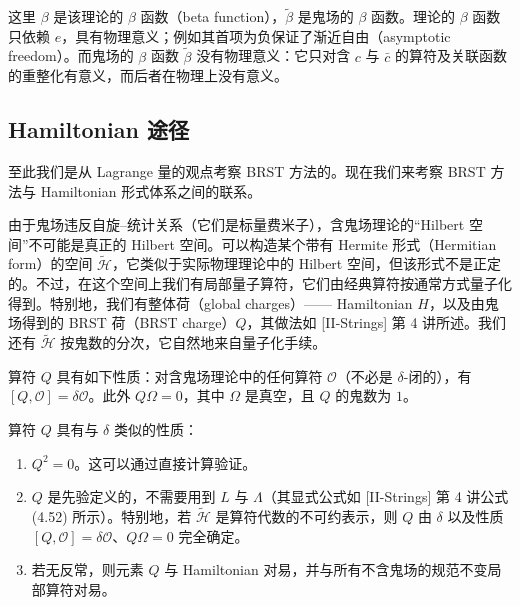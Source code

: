 这里 $\beta$ 是该理论的 $\beta$ 函数（beta function），$\widetilde{\beta}$ 是鬼场的 $\beta$ 函数。理论的 $\beta$ 函数只依赖 $e$，具有物理意义；例如其首项为负保证了渐近自由（asymptotic freedom）。而鬼场的 $\beta$ 函数 $\widetilde{\beta}$ 没有物理意义：它只对含 $c$ 与 $\bar c$ 的算符及关联函数的重整化有意义，而后者在物理上没有意义。


\subsection{Hamiltonian 途径}

至此我们是从 Lagrange 量的观点考察 BRST 方法的。现在我们来考察 BRST 方法与 Hamiltonian 形式体系之间的联系。

由于鬼场违反自旋–统计关系（它们是标量费米子），含鬼场理论的“Hilbert 空间”不可能是真正的 Hilbert 空间。可以构造某个带有 Hermite 形式（Hermitian form）的空间 $\widetilde{\mathcal{H}}$，它类似于实际物理理论中的 Hilbert 空间，但该形式不是正定的。不过，在这个空间上我们有局部量子算符，它们由经典算符按通常方式量子化得到。特别地，我们有整体荷（global charges）—— Hamiltonian $H$，以及由鬼场得到的 BRST 荷（BRST charge）$Q$，其做法如 [II-Strings] 第 4 讲所述。我们还有 $\widetilde{\mathcal{H}}$ 按鬼数的分次，它自然地来自量子化手续。

算符 $Q$ 具有如下性质：对含鬼场理论中的任何算符 $\mathcal{O}$（不必是 $\delta$-闭的），有 $[Q,\mathcal{O}]=\delta\mathcal{O}$。此外 $Q\Omega=0$，其中 $\Omega$ 是真空，且 $Q$ 的鬼数为 $1$。

算符 $Q$ 具有与 $\delta$ 类似的性质：

\begin{enumerate}
  \item $Q^2=0$。这可以通过直接计算验证。
\end{enumerate}

\begin{enumerate}
  \setcounter{enumi}{1}
  \item $Q$ 是先验定义的，不需要用到 $L$ 与 $\Lambda$（其显式公式如 [II-Strings] 第 4 讲公式 (4.52) 所示）。特别地，若 $\widetilde{\mathcal{H}}$ 是算符代数的不可约表示，则 $Q$ 由 $\delta$ 以及性质 $[Q,\mathcal{O}]=\delta\mathcal{O}$、$Q\Omega=0$ 完全确定。
  \item 若无反常，则元素 $Q$ 与 Hamiltonian 对易，并与所有不含鬼场的规范不变局部算符对易。
\end{enumerate}

